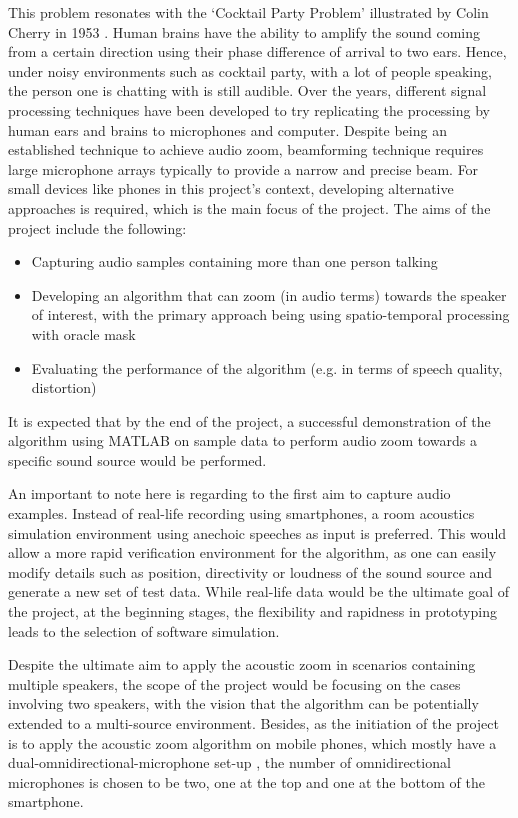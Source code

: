 \documentclass[a4paper,twoside,12pt,hidelinks]{article}
\begin{document}
This problem resonates with the `Cocktail Party Problem' illustrated by Colin Cherry in 1953 \cite{Cherry1953SomeEars}. Human brains have the ability to amplify the sound coming from a certain direction using their phase difference of arrival to two ears. Hence, under noisy environments such as cocktail party, with a lot of people speaking, the person one is chatting with is still audible. Over the years, different signal processing techniques have been developed to try replicating the processing by human ears and brains to microphones and computer. \cite{Mitchell1971SignalEffect} Despite being an established technique to achieve audio zoom, beamforming technique requires large microphone arrays typically to provide a narrow and precise beam. For small devices like phones in this project's context, developing alternative approaches is required, which is the main focus of the project. The aims of the project include the following: 
\begin{itemize}
\item Capturing audio samples containing more than one person talking
\item Developing an algorithm that can zoom (in audio terms) towards the speaker of interest, with the primary approach being using spatio-temporal processing with oracle mask
\item Evaluating the performance of the algorithm (e.g. in terms of speech quality, distortion)
\end{itemize}
It is expected that by the end of the project, a successful demonstration of the algorithm using MATLAB on sample data to perform audio zoom towards a specific sound source would be performed.

An important to note here is regarding to the first aim to capture audio examples. Instead of real-life recording using smartphones, a room acoustics simulation environment using anechoic speeches as input is preferred. This would allow a more rapid verification environment for the algorithm, as one can easily modify details such as position, directivity or loudness of the sound source and generate a new set of test data. While real-life data would be the ultimate goal of the project, at the beginning stages, the flexibility and rapidness in prototyping leads to the selection of software simulation.

Despite the ultimate aim to apply the acoustic zoom in scenarios containing multiple speakers, the scope of the project would be focusing on the cases involving two speakers, with the vision that the algorithm can be potentially extended to a multi-source environment. Besides, as the initiation of the project is to apply the acoustic zoom algorithm on mobile phones, which mostly have a dual-omnidirectional-microphone set-up \cite{Jeub2012NoiseDifferences}, the number of omnidirectional microphones is chosen to be two, one at the top and one at the bottom of the smartphone.
\end{document}
